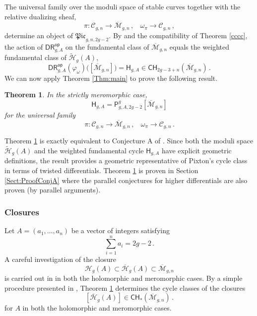 \documentclass[a4paper,12pt]{article} %
\def\oM{\overline{\mathcal{M}}}
\def\cM{{\mathcal{M}}}
\def\HH{\mathcal{H}}
\theoremstyle{definition}
\theoremstyle{plain}%
\newtheorem{theorem}[definition]{Theorem}
\renewcommand{\phi}{\varphi}
\newcommand{\Picabs}{\mathfrak{Pic}}
\begin{document}
The  
universal family over the moduli space of
stable curves together with the 
relative dualizing sheaf,
\begin{equation}\label{rrrr}
\pi: \mathcal{C}_{g,n} \rightarrow \overline{\cM}_{g,n}\, , \ \ \ \ \omega_\pi \rightarrow \mathcal{C}_{g,n}\, ,
\end{equation}
determine an object of
$\Picabs_{g,n,2g-2}$.
By \cite{Holmes2019Infinitesimal-s} and
the compatibility of Theorem \ref{cccc},
the action of $\mathsf{DR}^{\mathsf{op}}_{g,A}$ on the fundamental class
of $\overline{\mathcal{M}}_{g,n}$ equals the  weighted
fundamental class of $\widetilde{\HH}_g(A)$,
$$\mathsf{DR}^{\mathsf{op}}_{g,A}(\phi_\omega)\Big( [\overline{\mathcal{M}}_{g,n}]\Big)= \mathsf{H}_{g,A}
\in {\mathsf{CH}}_{2g-3+n}(\overline{\mathcal{M}}_{g,n})
\, .$$
We can now apply Theorem \ref{Thm:main} to prove the following result.
 
\begin{theorem}\label{FPA1}
In the strictly meromorphic case,
$$\mathsf{H}_{g,A} = \mathsf{P}_{g,A,2g-2}^g[\oM_{g,n}]$$
for the universal family
$$\pi: \mathcal{C}_{g,n} \rightarrow \overline{\cM}_{g,n}\, ,\ \ \ \
\omega_\pi \rightarrow \mathcal{C}_{g,n}\,. $$
\end{theorem}


Theorem \ref{FPA1} is exactly equivalent to Conjecture A of 
\cite[Appendix A]{Farkas2016The-moduli-spac}.
Since both the moduli space  $\widetilde{\HH}_g(A)$ and the weighted
fundamental cycle 
$\mathsf{H}_{g,A}$
have explicit geometric definitions, 
the result provides a geometric representative
of Pixton's cycle class in terms of twisted differentials. 
Theorem \ref{FPA1} is proven in Section \ref{Sect:ProofConjA} where the parallel conjectures \cite{Schmitt2016Dimension-theor}
for higher differentials  are also proven (by parallel  arguments).

\subsubsection{Closures}
Let $A=(a_1,\ldots, a_n)$ be a vector of integers satisfying
$$\sum_{i=1}^n a_i =2g-2\, .$$
A careful investigation of the closure
$$\HH_g(A) \subset \overline{\HH}_g(A) \subset \oM_{g,n}$$
is carried out in \cite{Bainbridge2018Compactificatio} in
both the holomorphic and meromorphic cases.
By a simple procedure presented in \cite[Appendix]{Farkas2016The-moduli-spac},
Theorem \ref{FPA1} determines the cycle classes of the 
closures
$$ [\overline{\HH}_g(A)] \in \mathsf{CH}_{*} (\oM_{g,n})\, .$$
for $A$ in both the holomorphic and meromorphic cases. 
\end{document}
